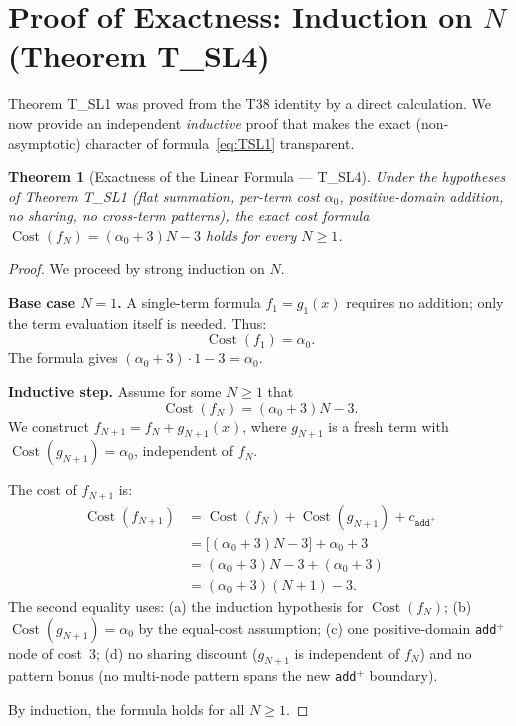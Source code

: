 \documentclass[12pt,a4paper]{article}
\newtheorem{theorem}{Theorem}[section]
\theoremstyle{definition}
\newcommand{\Cost}{\operatorname{Cost}}
\begin{document}
\section{Proof of Exactness: Induction on $N$ (Theorem T\_SL4)}
\label{sec:exactness}

Theorem T\_SL1 was proved from the T38 identity by a direct calculation.
We now provide an independent \emph{inductive} proof that makes the exact
(non-asymptotic) character of formula~\eqref{eq:TSL1} transparent.

\begin{theorem}[Exactness of the Linear Formula --- T\_SL4]
\label{thm:TSL4}
Under the hypotheses of Theorem T\_SL1 (flat summation, per-term cost
$\alpha_0$, positive-domain addition, no sharing, no cross-term patterns),
the exact cost formula $\Cost(f_N) = (\alpha_0 + 3)N - 3$ holds for every
$N \geq 1$.
\end{theorem}

\begin{proof}
We proceed by strong induction on $N$.

\medskip
\noindent\textbf{Base case $N = 1$.}
A single-term formula $f_1 = g_1(x)$ requires no addition; only the term
evaluation itself is needed.  Thus:
\[
  \Cost(f_1) = \alpha_0.
\]
The formula gives $(\alpha_0 + 3) \cdot 1 - 3 = \alpha_0$. \checkmark

\medskip
\noindent\textbf{Inductive step.}
Assume for some $N \geq 1$ that
\[
  \Cost(f_N) = (\alpha_0 + 3)N - 3.
\]
We construct $f_{N+1} = f_N + g_{N+1}(x)$, where $g_{N+1}$ is a fresh term
with $\Cost(g_{N+1}) = \alpha_0$, independent of $f_N$.

The cost of $f_{N+1}$ is:
\begin{align*}
  \Cost(f_{N+1})
    &= \Cost(f_N) + \Cost(g_{N+1}) + c_{\texttt{add}^+} \\
    &= \bigl[(\alpha_0 + 3)N - 3\bigr] + \alpha_0 + 3 \\
    &= (\alpha_0 + 3)N - 3 + (\alpha_0 + 3) \\
    &= (\alpha_0 + 3)(N + 1) - 3.
\end{align*}
The second equality uses:
(a) the induction hypothesis for $\Cost(f_N)$;
(b) $\Cost(g_{N+1}) = \alpha_0$ by the equal-cost assumption;
(c) one positive-domain \texttt{add}$^+$ node of cost~3;
(d) no sharing discount ($g_{N+1}$ is independent of $f_N$) and no pattern
    bonus (no multi-node pattern spans the new \texttt{add}$^+$ boundary).

\medskip
\noindent By induction, the formula holds for all $N \geq 1$. \qedhere
\end{proof}
\end{document}
